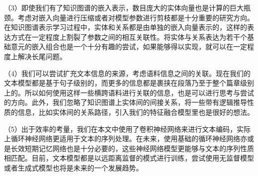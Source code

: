 （3）即使我们有了知识图谱的嵌入表示，数目庞大的实体向量也是计算的巨大瓶颈。考虑对嵌入向量进行压缩或者对模型参数进行剪枝都是十分重要的研究方向。在知识图谱表示学习过程中，实体和关系都是由单独的嵌入向量表示的，这样的表达方式在一定程度上割裂了参数之间的相互关联性。将实体与关系表达为若干个基础意元的嵌入组合也是一个十分有趣的尝试，如果能够得以实现，就可以在一定程度上解决长尾问题。

（4）我们可以尝试扩充文本信息的来源，考虑语料信息之间的关联。现在我们的文本模型都是基于句子级别的，而更多的信息都是裹挟在段落乃至于整个篇章级别上的。所以如何使用这样一些横跨语料进行关联的信息，也是可以进行思考与尝试的方向。此外，我们忽略了知识图谱上实体间的间接关系，将一些带有逻辑推导性质的信息，比如实体间的关系路径，引入我们的特征融合模型里也是很好的想法。

（5）出于效率的考量，我们在本文中使用了卷积神经网络来进行文本编码，实际上循环神经网络更适用于文本的序列处理。在未来，使用基础的循环神经网络亦或是长效短期记忆网络也是十分必要的，这些神经网络模型更能够与文本的序列性质相匹配。目前，文本模型都是以远距离监督的模式进行训练，尝试使用无监督模型或者生成式模型也将是未来的一个发展趋势。

